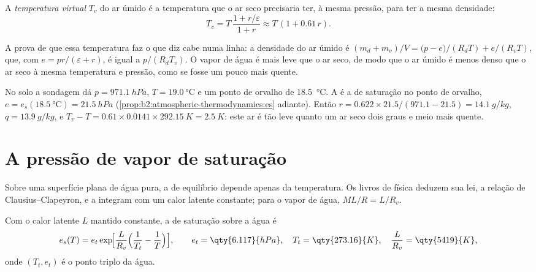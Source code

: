 \begin{definition}\label{def:b2:atmospheric-thermodynamics:virtual}
A \emph{temperatura virtual} $T_v$ do ar úmido é a temperatura
que o ar seco precisaria ter, à mesma pressão, para ter a mesma densidade:
\[
  T_v = T\,\frac{1 + r/\varepsilon}{1 + r} \approx T\,(1 + 0.61\,r) .
\]
\end{definition}

A prova de que essa temperatura faz o que diz cabe numa linha: a densidade do ar úmido é
$(m_d + m_v)/V = \bigl(p - e\bigr)/(R_dT) + e/(R_vT)$, que, com $e = pr/(\varepsilon + r)$,
é igual a $p/(R_dT_v)$. O vapor de água é mais leve que o ar seco, de modo que o ar úmido é menos denso que o ar seco
à mesma temperatura e pressão, como se fosse um pouco mais quente.

\begin{example}[O ar de Norman]\label{ex:b2:atmospheric-thermodynamics:norman}
No solo a sondagem dá $p = \qty{971.1}{hPa}$, $T = \qty{19.0}{\celsius}$ e um ponto de orvalho
de \qty{18.5}{\celsius}. A  é a  de saturação no ponto de
orvalho, $e = e_s(\qty{18.5}{\celsius}) = \qty{21.5}{hPa}$ (\cref{prop:b2:atmospheric-thermodynamics:es}
adiante). Então $r = 0.622 \times 21.5/(971.1 - 21.5) = \qty{14.1}{g/kg}$, $q = \qty{13.9}{g/kg}$,
e $T_v - T = 0.61 \times 0.0141 \times \qty{292.15}{K} = \qty{2.5}{K}$: este ar é tão leve quanto
um ar seco dois graus e meio mais quente.
\end{example}

\section{A pressão de vapor de saturação}\label{sec:b2:atmospheric-thermodynamics:saturation}

Sobre uma superfície plana de água pura, a  de equilíbrio depende apenas da
temperatura. Os livros de física deduzem sua lei, a relação de Clausius--Clapeyron, e a integram
com um calor latente constante; para o vapor de água, $M L/R = L/R_v$.

\begin{proposition}\label{prop:b2:atmospheric-thermodynamics:es}
Com o calor latente $L$ mantido constante, a  de saturação sobre a água é
\[
  e_s(T) = e_t \exp\!\Bigl[\frac{L}{R_v}\Bigl(\frac{1}{T_t} - \frac{1}{T}\Bigr)\Bigr],
  \qquad e_t = \qty{6.117}{hPa}, \quad T_t = \qty{273.16}{K}, \quad \frac{L}{R_v} =
  \qty{5419}{K},
\]
onde $(T_t, e_t)$ é o ponto triplo da água.
\end{proposition}

